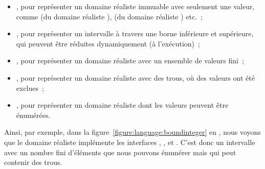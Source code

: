 \begin{itemize}

\item {}, pour représenter un domaine réaliste immuable avec
seulement une valeur, comme  (du domaine réaliste ),
 (du domaine réaliste ) etc.~;

\item {}, pour représenter un intervalle à travers une borne
inférieure et supérieure, qui peuvent être réduites dynamiquement (à
l'exécution)~;

\item {}, pour représenter un domaine réaliste avec un ensemble de
valeurs fini~;

\item {}, pour représenter un domaine réaliste avec des trous, \ie
où des valeurs ont été exclues~;

\item {}, pour représenter un domaine réaliste dont les valeurs
peuvent être énumérées.

\end{itemize}

Ainsi, par exemple, dans la figure~\ref{figure:language:boundinteger} en
, nous voyons que le domaine réaliste  implémente
les interfaces , ,  et
. C'est donc un intervalle avec un nombre fini d'éléments que
nous pouvons énumérer mais qui peut contenir des trous.

